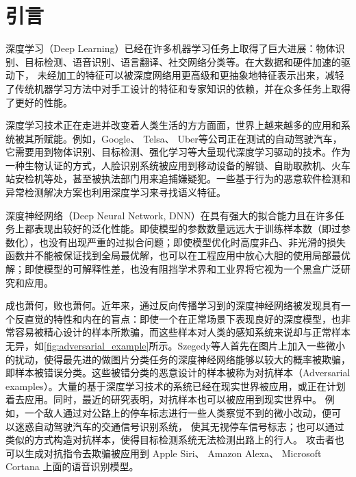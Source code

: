 \chapter{引言}

深度学习（Deep Learning）已经在许多机器学习任务上取得了巨大进展：物体识别\cite{krizhevsky2012imagenet}、目标检测\cite{redmon2016you}、语音识别\cite{saon2015ibm}、语言翻译\cite{sutskever2014sequence}、社交网络分类\cite{thomax2017semisupervised}等。在大数据和硬件加速的驱动下， 未经加工的特征可以被深度网络用更高级和更抽象地特征表示出来，减轻了传统机器学习方法中对手工设计的特征和专家知识的依赖，并在众多任务上取得了更好的性能。

深度学习技术正在走进并改变着人类生活的方方面面，世界上越来越多的应用和系统被其所赋能。例如，Google、 Telsa、 Uber等公司正在测试的自动驾驶汽车，它需要用到物体识别、目标检测、强化学习等大量现代深度学习驱动的技术。作为一种生物认证的方式，人脸识别系统被应用到移动设备的解锁、自助取款机、火车站安检机等处，甚至被执法部门用来追捕嫌疑犯。一些基于行为的恶意软件检测和异常检测解决方案也利用深度学习来寻找语义特征\cite{saxe2015deep}。

深度神经网络（Deep Neural Network, DNN）在具有强大的拟合能力且在许多任务上都表现出较好的泛化性能。即使模型的参数数量远远大于训练样本数（即过参数化），也没有出现严重的过拟合问题；即使模型优化时高度非凸、非光滑的损失函数并不能被保证找到全局最优解，也可以在工程应用中放心大胆的使用局部最优解；即使模型的可解释性差，也没有阻挡学术界和工业界将它视为一个黑盒广泛研究和应用。

成也萧何，败也萧何。近年来，通过反向传播学习到的深度神经网络被发现具有一个反直觉的特性和内在的盲点：即使一个在正常场景下表现良好的深度模型，也非常容易被精心设计的样本所欺骗，而这些样本对人类的感知系统来说却与正常样本无异\cite{goodfellow2014explaining}，如\autoref{fig:adversarial_example}所示。Szegedy等人首先在图片上加入一些微小的扰动，使得最先进的做图片分类任务的深度神经网络能够以较大的概率被欺骗，即样本被错误分类。这些被错分类的恶意设计的样本被称为对抗样本（Adversarial examples）\cite{szegedy2013intriguing}。大量的基于深度学习技术的系统已经在现实世界被应用，或正在计划着去应用。同时，最近的研究表明，对抗样本也可以被应用到现实世界中。 例如，一个敌人通过对公路上的停车标志进行一些人类察觉不到的微小改动，便可
以迷惑自动驾驶汽车的交通信号识别系统， 使其无视停车信号标志\cite{kurakin2016adversarial, Eykholt_2018_CVPR}；也可以通过类似的方式构造对抗样本，使得目标检测系统无法检测出路上的行人\cite{xie2017adversarial}。 攻击者也可以生成对抗指令去欺骗被应用到 Apple Siri、 Amazon Alexa、 Microsoft Cortana 上面的语音识别模型\cite{carlini2016hidden, zhang2017dolphinattack}。

